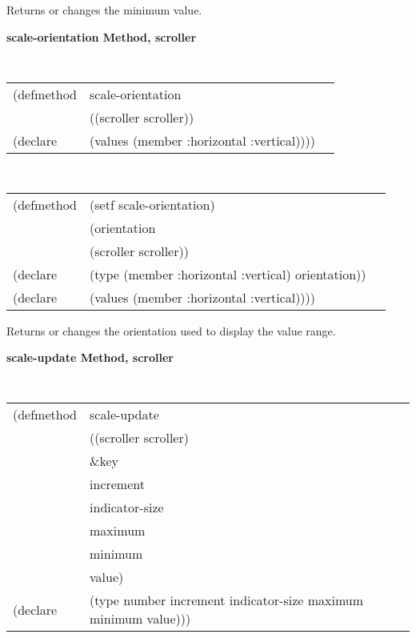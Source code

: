 \begin{flushright} \parbox[t]{6.125in}{
Returns or changes the minimum value.}
\end{flushright}




{\samepage  
{\large {\bf scale-orientation \hfill Method, scroller}}
\begin{flushright} \parbox[t]{6.125in}{
\tt
\begin{tabular}{lll}
\raggedright
(defmethod & scale-orientation & \\
& ((scroller  scroller)) \\
(declare & (values (member :horizontal :vertical))))
\end{tabular}
\rm

}\end{flushright}}

\begin{flushright} \parbox[t]{6.125in}{
\tt
\begin{tabular}{lll}
\raggedright
(defmethod & (setf scale-orientation) & \\
         & (orientation \\
         & (scroller  scroller)) \\
(declare &(type (member :horizontal :vertical)  orientation))\\
(declare & (values (member :horizontal :vertical))))
\end{tabular}
\rm}
\end{flushright}

\begin{flushright} \parbox[t]{6.125in}{
Returns or changes the orientation used to display the value range.}
\end{flushright}

{\samepage  
{\large {\bf scale-update \hfill Method, scroller}}
\begin{flushright} \parbox[t]{6.125in}{
\tt
\begin{tabular}{lll}
\raggedright
(defmethod & scale-update & \\
& ((scroller  scroller) \\
& \&key \\
& increment \\
& indicator-size \\
& maximum \\
& minimum \\
& value)\\
(declare & (type number increment indicator-size maximum minimum value)))
\end{tabular}
\rm

}\end{flushright}}

